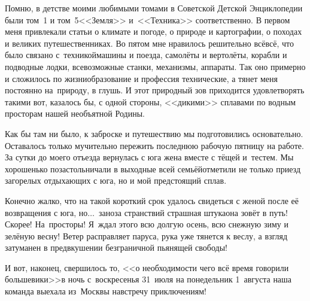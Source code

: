 Помню, в детстве моими любимыми томами в Советской Детской Энциклопедии были том~1 и том~5\mdash <<Земля>> и~<<Техника>> соответственно. В первом меня привлекали статьи о климате и погоде, о природе и картографии, о походах и великих путешественниках. Во пятом мне нравилось решительно всё\mdash всё, что было связано с~техникой\mdash машины и поезда, самолёты и вертолёты, корабли и подводные лодки, всевозможные станки, механизмы, аппараты. Так оно примерно и сложилось по жизни\mdash образование и профессия технические, а тянет меня постоянно на~природу, в глушь. И этот природный зов приходится удовлетворять такими вот, казалось бы, с одной стороны, <<дикими>> сплавами по водным просторам нашей необъятной Родины.

Как бы там ни было, к заброске и путешествию мы подготовились основательно. Оставалось только мучительно пережить последнюю рабочую пятницу на работе. За сутки до моего отъезда вернулась с юга жена вместе с тёщей и~тестем. Мы хорошенько позастольничали в выходные всей семьёй\mdash отметили не только приезд загорелых отдыхающих с юга, но и мой предстоящий сплав. 

Конечно жалко, что на такой короткий срок удалось свидеться с женой после её возвращения с юга, но$\ldots$~заноза странствий страшная штука\mdash она зовёт в путь! Скорее! На~просторы! Я~ждал этого всю долгую осень, всю снежную зиму и зелёную весну! Ветер расправляет паруса, рука уже тянется к веслу, а взгляд затуманен в предвкушении безграничной пьянящей свободы!

И вот, наконец, свершилось то, <<о необходимости чего всё время говорили большевики>>\cite{ЛенинПСС}\mdash в ночь с~воскресенья 31~июля на понедельник 1~августа наша команда выехала из~Москвы навстречу приключениям!

\begin{center}
\end{center}
